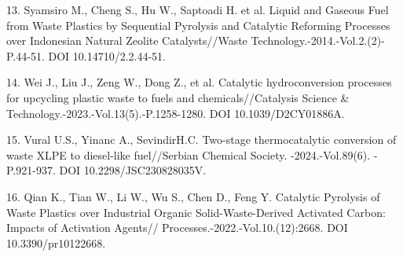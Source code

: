 \begin{refs}
13. Syamsiro M., Cheng S., Hu W., Saptoadi H. et al. Liquid and
Gaseous Fuel from Waste Plastics by Sequential Pyrolysis and Catalytic
Reforming Processes over Indonesian Natural Zeolite Catalysts//Waste
Technology.-2014.-Vol.2.(2)- P.44-51. DOI 10.14710/2.2.44-51.

14. Wei J., Liu J., Zeng W., Dong Z., et al. Catalytic hydroconversion
processes for upcycling plastic waste to fuels and
chemicals//Catalysis Science \&
Technology.-2023.-Vol.13(5).-P.1258-1280. DOI 10.1039/D2CY01886A.

15. Vural U.S., Yinanc A., SevindirH.C. Two-stage thermocatalytic
conversion of waste XLPE to diesel-like fuel//Serbian Chemical
Society.  -2024.-Vol.89(6). -P.921-937. DOI 10.2298/JSC230828035V.

16. Qian K., Tian W., Li W., Wu S., Chen D., Feng Y. Catalytic
Pyrolysis of Waste Plastics over Industrial Organic
Solid-Waste-Derived Activated Carbon: Impacts of Activation Agents//
Processes.-2022.-Vol.10.(12):2668. DOI 10.3390/pr10122668.
\end{refs}

